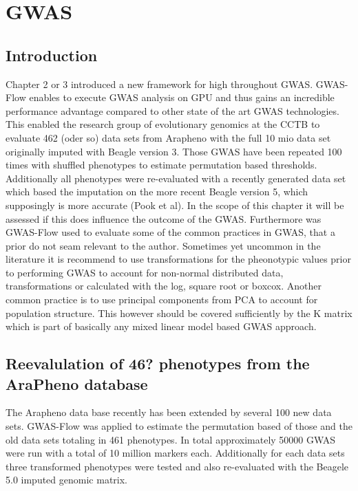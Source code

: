 
\chapter{GWAS}

\label{Chapter5} %

\section{Introduction}
Chapter 2 or 3 introduced a new framework for high throughout GWAS. GWAS-Flow enables to execute GWAS analysis
on GPU and thus gains an incredible performance advantage compared to other state of the art GWAS
technologies. This enabled the research group of evolutionary genomics at the CCTB to evaluate 462 (oder so)
data sets from Arapheno with the full 10 mio data set originally imputed with Beagle version 3.  Those GWAS
have been repeated 100 times with shuffled phenotypes to estimate permutation based thresholds. Additionally
all phenotypes were re-evaluated with a recently generated data set which based the imputation on the more
recent Beagle version 5, which supposingly is more accurate (Pook et al). In the scope of this chapter it will
be assessed if this does influence the outcome of the GWAS. Furthermore was GWAS-Flow used to evaluate some of
the common practices in GWAS, that a prior do not seam relevant to the author. Sometimes yet uncommon in the
literature it is recommend to use transformations for the pheonotypic values prior to performing GWAS to
account for non-normal distributed data, transformations or calculated with the log, square root or
boxcox. Another common practice is to use principal components from PCA to account for population
structure. This however should be covered sufficiently by the K matrix which is part of basically any mixed
linear model based GWAS approach.


\section{Reevalulation of 46? phenotypes from the AraPheno database}

The Arapheno data base recently has been extended by several 100 new data sets. GWAS-Flow was applied to
estimate the permutation based of those and the old data sets totaling in 461 phenotypes.  In total
approximately 50000 GWAS were run with a total of 10 million markers each.
Additionally for each data sets three transformed phenotypes were tested and also re-evaluated with the Beagele 5.0 imputed genomic matrix. 



